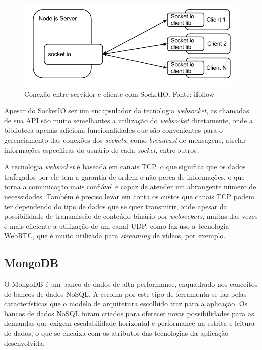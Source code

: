 \begin{figure}[H]
	\centering
	\includegraphics[scale=0.67]{imagens/socketio.png}
	\caption{\small Conexão entre servidor e cliente com SocketIO. Fonte: ifollow \cite{img-socketio}}
	\label{fig:socketio}
\end{figure}

Apesar do SocketIO ser um encapsulador da tecnologia \textit{websocket}, as chamadas de sua API são muito semelhantes a utilização do \textit{websocket} diretamente, onde a biblioteca apenas adiciona funcionalidades que são convenientes para o gerenciamento das conexões dos \textit{sockets}, como \textit{broadcast} de mensagens, atrelar informações específicas do usuário de cada \textit{socket}, entre outros.

A tecnologia \textit{websocket} é baseada em canais TCP, o que significa que os dados trafegados por ele tem a garantia de ordem e não perca de informações, o que torna a comunicação mais confiável e capaz de atender um abrangente número de necessidades. Também é preciso levar em conta os custos que canais TCP podem ter dependendo do tipo de dados que se quer transmitir, onde apesar da possibilidade de transmissão de conteúdo binário por \textit{websockets}, muitas das vezes é mais eficiente a utilização de um canal UDP, como faz uso a tecnologia WebRTC, que é muito utilizada para \textit{streaming} de vídeos, por exemplo.

\subsection{MongoDB}
O MongoDB é um banco de dados de alta performance, enquadrado nos conceitos de bancos de dados NoSQL. A escolha por este tipo de ferramenta se faz pelas características que o modelo de arquitetura escolhido traz para a aplicação. Os bancos de dados NoSQL foram criados para oferecer novas possibilidades para as demandas que exigem escalabilidade horizontal e performance na estrita e leitura de dados, o que se encaixa com os atributos das tecnologias da aplicação desenvolvida.

